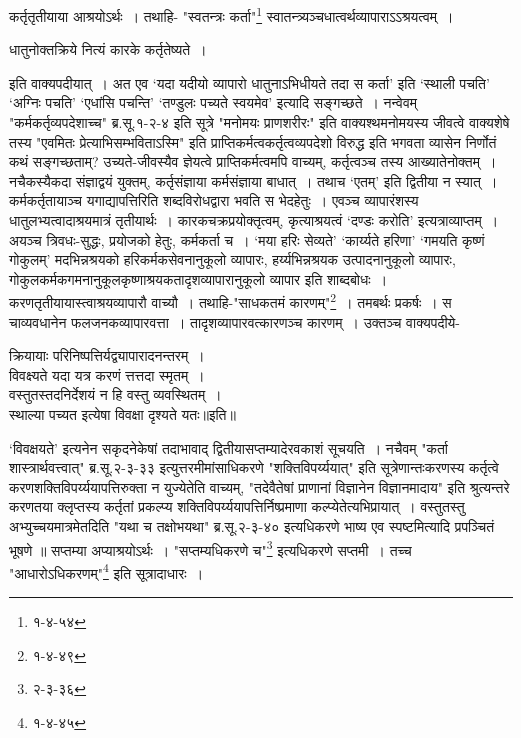 {{{{ कर्तृतृतीयाया आश्रयोऽर्थः~।
तथाहि- "स्वतन्त्रः कर्ता"\footnote{१-४-५४} स्वातन्त्र्यञ्चधात्वर्थव्यापाराऽऽश्रयत्वम्~।
\begin{center} धातुनोक्तक्रिये नित्यं कारके कर्तृतेष्यते~।
\end{center} इति वाक्यपदीयात्~।
अत एव `यदा यदीयो व्यापारो धातुनाऽभिधीयते तदा स कर्ता' इति `स्थाली पचति' `अग्निः पचति' `एधांसि पचन्ति' `तण्डुलः पच्यते स्वयमेव' इत्यादि सङ्गच्छते~।
 नन्वेवम् "कर्मकर्तृव्यपदेशाच्च" {ब्र.सू.१-२-४} इति सूत्रे "मनोमयः प्राणशरीरः" इति वाक्यश्थमनोमयस्य जीवत्वे वाक्यशेषे तस्य "एवमितः प्रेत्याभिसम्भविताऽस्मि" इति प्राप्तिकर्मत्वकर्तृत्वव्यपदेशो विरुद्ध इति भगवता व्यासेन निर्णोतं कथं सङ्गच्छताम्? उच्यते-जीवस्यैव ज्ञेयत्वे प्राप्तिकर्मत्वमपि वाच्यम्, कर्तृत्वञ्च तस्य आख्यातेनोक्तम्~।
नचैकस्यैकदा संज्ञाद्वयं युक्तम्, कर्तृसंज्ञाया कर्मसंज्ञाया बाधात्~।
तथाच `एतम्' इति द्वितीया न स्यात्~।
कर्मकर्तृतायाञ्च यगाद्यापत्तिरिति शब्दविरोधद्वारा भवति स भेदहेतुः~।
 एवञ्च व्यापारंशस्य धातुलभ्यत्वादाश्रयमात्रं तृतीयार्थः~।
कारकचक्रप्रयोक्तृत्वम्, कृत्याश्रयत्वं `दण्डः करोति' इत्यत्राव्याप्तम्~।
 अयञ्च त्रिवधः-सुद्धः, प्रयोजको हेतुः, कर्मकर्ता च~।
`मया हरिः सेव्यते' `कार्य्यते हरिणा' `गमयति कृष्णं गोकुलम्' मदभिन्नश्रयको हरिकर्मकसेवनानुकूलो व्यापारः, हर्य्यभिन्नश्रयक उत्पादनानुकूलो व्यापारः, गोकुलकर्मकगमनानुकूलकृष्णाश्रयकतादृशव्यापारानुकूलो व्यापार इति शाब्दबोधः~।
करणतृतीयायास्त्वाश्रयव्यापारौ वाच्यौ~।
तथाहि-"साधकतमं कारणम्"\footnote{१-४-४९}~।
तमबर्थः प्रकर्षः~।
स चाव्यवधानेन फलजनकव्यापारवत्ता~।
 तादृशव्यापारवत्कारणञ्च कारणम्~।
उक्तञ्च वाक्यपदीये-
\begin{center} क्रियायाः परिनिष्पत्तिर्यद्व्यापारादनन्तरम्~।\\
 विवक्ष्यते यदा यत्र करणं त्तत्तदा स्मृतम्~।\\[10pt]
 वस्तुतस्तदनिर्देशयं न हि वस्तु व्यवस्थितम्~।\\
 स्थाल्या पच्यत इत्येषा विवक्षा दृश्यते यतः॥इति॥
\end{center} `विवक्षयते' इत्यनेन सकृदनेकेषां तदाभावाद् द्वितीयासप्तम्यादेरवकाशं सूचयति~।
 नचैवम् "कर्ता शास्त्रार्थवत्त्वात्" {ब्र.सू.२-३-३३} इत्युत्तरमीमांसाधिकरणे "शक्तिविपर्य्ययात्" इति सूत्रेणान्तःकरणस्य कर्तृत्वे करणशक्तिविपर्य्ययापत्तिरुक्ता न युज्येतेति वाच्यम्, "तदेवैतेषां प्राणानां विज्ञानेन विज्ञानमादाय" इति श्रुत्यन्तरे करणतया क्लृप्तस्य कर्तृतां प्रकल्प्य शक्तिविपर्य्ययापत्तिर्निष्प्रमाणा कल्प्येतेत्यभिप्रायात्~।
 वस्तुतस्तु अभ्युच्चयमात्रमेतदिति "यथा च तक्षोभयथा" {ब्र.सू.२-३-४०} इत्यधिकरणे भाष्य एव स्पष्टमित्यादि प्रपञ्चितं भूषणे ॥
 सप्तम्या अप्याश्रयोऽर्थः~।
"सप्तम्यधिकरणे च"\footnote{२-३-३६} इत्यधिकरणे सप्तमी~।
तच्च "आधारोऽधिकरणम्"\footnote{१-४-४५} इति सूत्रादाधारः~।
}}}}
